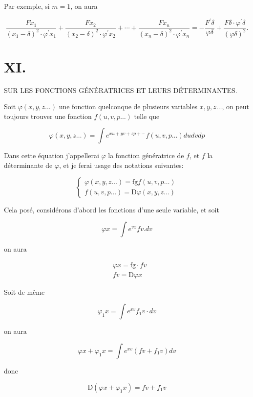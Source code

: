 \documentclass{article}
\begin{document}
Par exemple, si \(m=1\), on aura

\[
\frac{F x_{1}}{\left(x_{1}-\delta\right)^{2} \cdot \varphi^{\prime} x_{1}}+\frac{F x_{2}}{\left(x_{2}-\delta\right)^{2} \cdot \varphi^{\prime} x_{2}}+\cdots+\frac{F x_{n}}{\left(x_{n}-\delta\right)^{2} \cdot \varphi^{\prime} x_{n}}=-\frac{F^{\prime} \delta}{\varphi \delta}+\frac{F \delta \cdot \varphi^{\prime} \delta}{(\varphi \delta)^{2}} .
\]

\section*{XI.}

SUR LES FONCTIONS GÉNÉRATRICES ET LEURS DÉTERMINANTES.

Soit \(\varphi(x, y, z \ldots)\) une fonction quelconque de plusieurs variables \(x, y, z \ldots\), on peut toujours trouver une fonction \(f(u, v, p \ldots)\) telle que

\[
\varphi(x, y, z \ldots)=\int e^{x u+y v+z p+\cdots} f(u, v, p \ldots) d u d v d p
\]

Dans cette équation j'appellerai \(\varphi\) la fonction génératrice de \(f\), et \(f\) la déterminante de \(\varphi\), et je ferai usage des notations suivantes:

\[
\left\{\begin{array}{l}
\varphi(x, y, z \ldots)=\mathrm{fg} f(u, v, p \ldots) \\
f(u, v, p \ldots)=\mathrm{D} \varphi(x, y, z \ldots)
\end{array}\right.
\]

Cela posé, considérons d'abord les fonctions d'une seule variable, et soit

\[
\varphi x=\int e^{v x} f v . d v
\]

on aura

\[
\begin{aligned}
& \varphi x=\mathrm{fg} \cdot f v \\
& f v=\mathrm{D} \varphi x
\end{aligned}
\]

Soit de même

\[
\varphi_{1} x=\int e^{x v} f_{1} v \cdot d v
\]

on aura

\[
\varphi x+\varphi_{1} x=\int e^{x v}\left(f v+f_{1} v\right) d v
\]

donc

\[
\mathrm{D}\left(\varphi x+\varphi_{1} x\right)=f v+f_{1} v
\]
\end{document}
